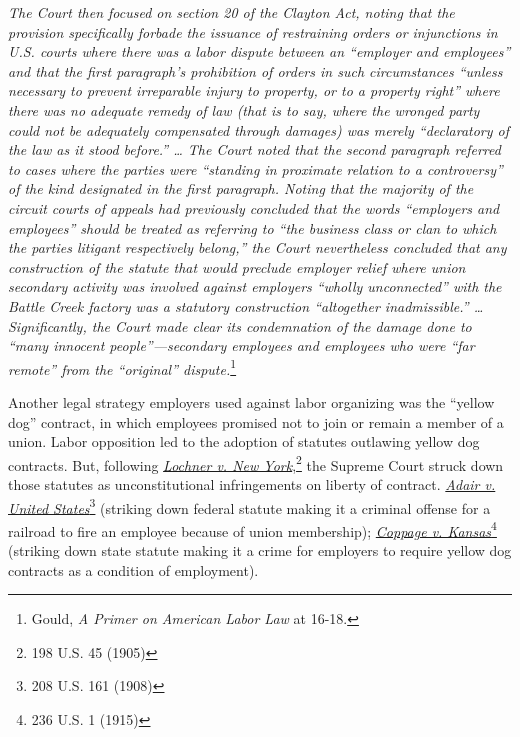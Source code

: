 \documentclass[
  letterpaper,
  11pt,
  DIV=9,
  openright]{scrbook}
\renewenvironment{quote}{
  \list{}{\leftmargin=2em\rightmargin=2em}
  \item\relax\small
}
{\endlist}
\begin{document}
\begin{quote}
\emph{The Court then focused on section 20 of the Clayton Act, noting
that the provision specifically forbade the issuance of restraining
orders or injunctions in U.S. courts where there was a labor dispute
between an ``employer and employees'' and that the first paragraph's
prohibition of orders in such circumstances ``unless necessary to
prevent irreparable injury to property, or to a property right'' where
there was no adequate remedy of law (that is to say, where the wronged
party could not be adequately compensated through damages) was merely
``declaratory of the law as it stood before.'' \ldots{} The Court noted
that the second paragraph referred to cases where the parties were
``standing in proximate relation to a controversy'' of the kind
designated in the first paragraph. Noting that the majority of the
circuit courts of appeals had previously concluded that the words
``employers and employees'' should be treated as referring to ``the
business class or clan to which the parties litigant respectively
belong,'' the Court nevertheless concluded that any construction of the
statute that would preclude employer relief where union secondary
activity was involved against employers ``wholly unconnected'' with the
Battle Creek factory was a statutory construction ``altogether
inadmissible.'' \ldots{} Significantly, the Court made clear its
condemnation of the damage done to ``many innocent people''---secondary
employees and employees who were ``far remote'' from the ``original''
dispute.}\footnote{Gould, \emph{A Primer on American Labor Law} at
  16-18.}
\end{quote}

Another legal strategy employers used against labor organizing was the
``yellow dog'' contract, in which employees promised not to join or
remain a member of a union. Labor opposition led to the adoption of
statutes outlawing yellow dog contracts. But, following
\href{https://scholar.google.com/scholar_case?case=10760991087928264675}{\emph{Lochner
v. New York}},\footnote{198 U.S. 45 (1905)} the Supreme Court struck
down those statutes as unconstitutional infringements on liberty of
contract.
\href{https://scholar.google.com/scholar_case?case=3072585965506695672}{\emph{Adair
v. United States}}\footnote{208 U.S. 161 (1908)} (striking down federal
statute making it a criminal offense for a railroad to fire an employee
because of union membership);
\href{https://scholar.google.com/scholar_case?case=14346855548018950039}{\emph{Coppage
v. Kansas}}\footnote{236 U.S. 1 (1915)} (striking down state statute
making it a crime for employers to require yellow dog contracts as a
condition of employment).
\end{document}
